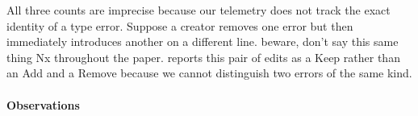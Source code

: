 \documentclass[english,submission,cleveref]{programming}
\begin{document}
All three counts are imprecise because our telemetry does not track the exact
identity of a type error.
Suppose a creator removes one  error but then
immediately introduces another on a different line.
\FILL{} beware, don't say this same thing Nx throughout the paper.
 reports this pair of edits as a Keep rather than
an Add and a Remove because we cannot distinguish two errors of the same kind.


\paragraph{Observations}

\end{document}
